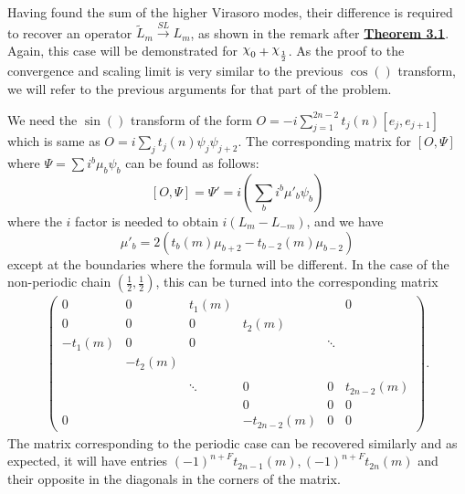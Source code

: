 \documentclass[twoside,11pt,titlepage]{amsart}
\renewcommand{\=}[1]{\stackrel{#1}{=}} %
\theoremstyle{definition}
\theoremstyle{remark}
\DeclareRobustCommand{\rchi}{{\mathpalette\irchi\relax}}
\newcommand{\irchi}[2]{\raisebox{\depth}{$#1\chi$}}
\begin{document}
\hfill \break
Having found the sum of the higher Virasoro modes, their difference is required to recover an operator $\widetilde{L}_m \xrightarrow{SL} L_m$, as shown in the remark after \hyperref[thm3.1]{\textbf{Theorem 3.1}}. Again, this case will be demonstrated for $\rchi_0+\rchi_\frac{1}{2}$. As the proof to the convergence and scaling limit is very similar to the previous $\cos()$ transform, we will refer to the previous arguments for that part of the problem.
 
We need the $\sin()$ transform of the form $O= -i\sum_{j=1}^{2n-2} t_j(n)[e_j,e_{j+1}]$ which is same as $O=i\sum_j t_j(n)\psi_{j}\psi_{j+2}$. The corresponding matrix for $[O,\Psi]$ where $\Psi=\sum i^b\mu_b \psi_b$ can be found as follows:
$$[O,\Psi]=\Psi'=i(\sum_b i^b\mu'_b\psi_b)$$
where the $i$ factor is needed to obtain $i(L_m-L_{-m})$, and we have
$$\mu'_b=2(t_b(m)\mu_{b+2}-t_{b-2}(m)\mu_{b-2})$$
except at the boundaries where the formula will be different. In the case of the non-periodic chain $(\frac{1}{2},\frac{1}{2})$, this can be turned into the corresponding matrix
\begin{align}\label{eq34}
\begin{pmatrix}
         0 & 0 & t_1(m) & & & 0 \\
         0 & 0 & 0 & t_2(m) & & \\
         -t_1(m) & 0 & 0 & & \ddots &  \\
         & -t_2(m) & & & & \\
         & & & & & \\
         & & \ddots & 0 & 0 & t_{2n-2}(m) \\
         & &  & 0 & 0 & 0 \\
        0 & &  & -t_{2n-2}(m) & 0 & 0 
\end{pmatrix}.
\end{align}
The matrix corresponding to the periodic case can be recovered similarly and as expected, it will have entries $(-1)^{n+F}t_{2n-1}(m),(-1)^{n+F}t_{2n}(m)$ and their opposite in the diagonals in the corners of the matrix.
\end{document}
